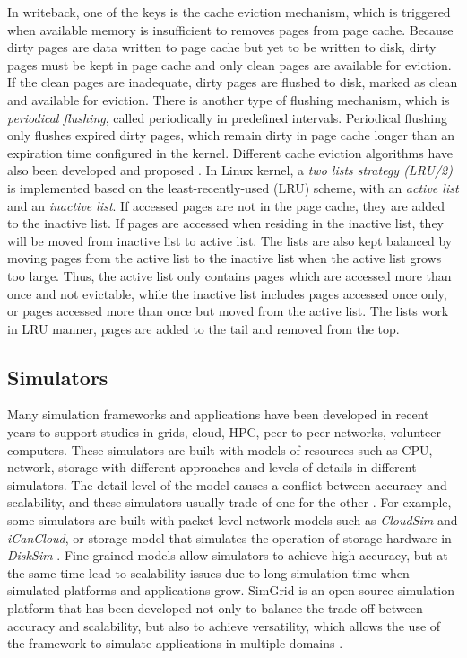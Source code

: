 \documentclass[conference]{IEEEtran}
\begin{document}
			In writeback, one of the keys is the cache eviction mechanism, which is
			triggered when available memory is insufficient to removes pages 
			from page cache. 
			Because dirty pages are data written to page cache but yet to be 
			written to disk, dirty pages must be kept in page cache and only clean pages 
			are available for eviction.
			If the clean pages are inadequate, dirty pages are flushed to disk, 
			marked as clean and available for eviction. 
			There is another type of flushing mechanism, which is 
			\textit{periodical flushing}, called periodically in predefined intervals. 
			Periodical flushing only flushes expired dirty pages, which remain dirty in 
			page cache longer than an expiration time configured in the kernel. 
			Different cache eviction algorithms have also been developed and proposed
			\cite{owda2014comparison}.
			In Linux kernel, a \textit{two lists strategy (LRU/2)} is implemented based on 
			the least-recently-used (LRU) scheme, with an \textit{active list} and 
			an \textit{inactive list}. 
			If accessed pages are not in the page cache, they are added to the inactive list. 
			If pages are accessed when residing in the inactive list, they will be moved from 
			inactive list to active list. 
			The lists are also kept balanced by moving pages from the active list
			to the inactive list when the active list grows too large.
			Thus, the active list only contains pages which are accessed more than once 
			and not evictable, while the inactive list includes pages accessed once only, 
			or pages accessed more than once but moved from the active list. 
			The lists work in LRU manner, pages are added to the tail and removed 
			from the top. 
			 
		\subsection{Simulators}
			
			Many simulation frameworks and applications have been developed 
			in recent years to support studies in grids, cloud, HPC, peer-to-peer 
			networks, volunteer computers. 					
			These simulators are built with models of resources such as CPU, network, 
			storage with different approaches and levels of details in different simulators. 
			The detail level of the model causes a conflict between accuracy and scalability, 
			and these simulators usually trade of one for the other 
			\cite{casanova2014simgrid}. 
			For example, some simulators are built with packet-level network models 
			such as \textit{CloudSim} and \textit{iCanCloud}, or storage model that 
			simulates the operation of storage hardware in \textit{DiskSim} 
			\cite{casanova2014simgrid}. 
			Fine-grained models allow simulators to achieve high accuracy, 
			but at the same time lead to scalability issues due to long simulation time 
			when simulated platforms and applications grow. 
			SimGrid is an open source simulation platform that has been developed 
			not only to balance the trade-off between accuracy and scalability, 
			but also to achieve versatility, which allows the use of the framework 
			to simulate applications in multiple domains \cite{casanova2014simgrid}.
			
\end{document}
